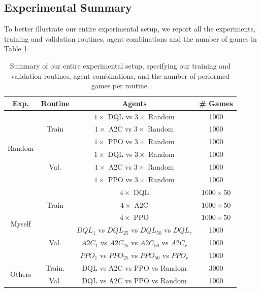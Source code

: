 \documentclass[a4paper,conference]{IEEEtran}
\begin{document}
\subsection{Experimental Summary}

To better illustrate our entire experimental setup, we report all the experiments, training and validation routines, agent combinations and the number of games in Table \ref{tab:experimentalSetup}.

\begin{table}[h!]
\centering
\begin{tabular}{ c | c | c | c }
 \textbf{Exp.} & \textbf{Routine} & \textbf{Agents} &  \textbf{\# Games}\\ \hline
 \multirow{ 6}{*}{Random}  & \multirow{ 3}{*}{Train} & $1\times$ DQL vs $3\times$ Random & 1000 \\
   &&$1\times$ A2C vs $3\times$  Random & 1000 \\
   &&$1\times$ PPO vs $3\times$  Random & 1000 \\ \cline{2-4}
      & \multirow{ 3}{*}{Val.} & $1\times$ DQL vs $3\times$  Random & 1000 \\
   &&$1\times$ A2C vs $3\times$  Random & 1000 \\
   &&$1\times$ PPO vs $3\times$  Random & 1000 \\ \hline
   
  \multirow{ 6}{*}{Myself}  & \multirow{ 3}{*}{Train} & $4\times$ DQL & $1000\times50$ \\
   &&$4\times$ A2C & $1000\times50$ \\
   &&$4\times$ PPO & $1000\times50$ \\ \cline{2-4}
      & \multirow{ 3}{*}{Val.} &  $DQL_1$ vs $DQL_25$ vs $DQL_{50}$ vs $DQL_{r}$ & 1000 \\
   &&$A2C_1$ vs $A2C_25$ vs $A2C_{50}$ vs $A2C_{r}$ & 1000 \\
   &&$PPO_1$ vs $PPO_25$ vs $PPO_{50}$ vs $PPO_{r}$ & 1000 \\ \hline 
   
     \multirow{ 2}{*}{Others}  & Train. & DQL vs A2C vs PPO vs Random & 3000 \\\cline{2-4}
      & Val. &  DQL vs A2C vs PPO vs Random & 1000 \\ \hline 
  
 
\end{tabular}
\caption{Summary of our entire experimental setup, specifying our training and validation routines, agent combinations, and the number of performed games per routine.}
\label{tab:experimentalSetup}
\end{table}
\end{document}
